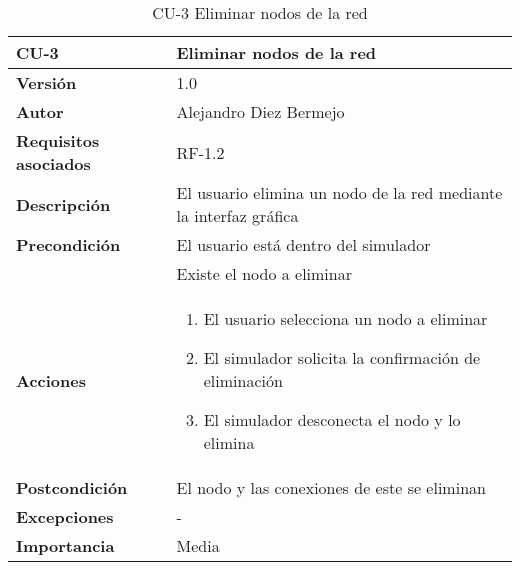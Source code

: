\begin{table}[p]
	\centering
	\begin{tabularx}{\linewidth}{ p{} p{} }
		\toprule
		\textbf{CU-3}    & \textbf{Eliminar nodos de la red}\\
		\toprule
		\textbf{Versión}              & 1.0    \\
		\textbf{Autor}                & Alejandro Diez Bermejo \\
		\textbf{Requisitos asociados} & RF-1.2 \\
		\textbf{Descripción}          & El usuario elimina un nodo de la red mediante la interfaz gráfica \\
		\textbf{Precondición}         & El usuario está dentro del simulador \\
        		                      & Existe el nodo a eliminar \\
		\textbf{Acciones}             &
		\begin{enumerate}
			\def\labelenumi{\arabic{enumi}.}
			\tightlist
			\item El usuario selecciona un nodo a eliminar
			\item El simulador solicita la confirmación de eliminación
            \item El simulador desconecta el nodo y lo elimina
		\end{enumerate}\\
		\textbf{Postcondición}        & El nodo y las conexiones de este se eliminan \\
		\textbf{Excepciones}          & - \\
		\textbf{Importancia}          & Media \\
		\bottomrule
	\end{tabularx}
	\caption{CU-3 Eliminar nodos de la red}
\end{table}

